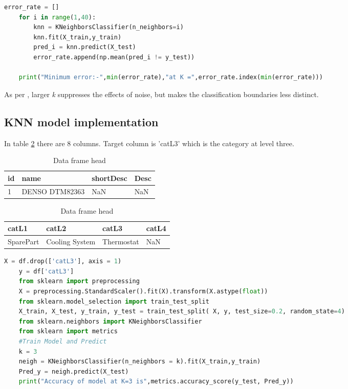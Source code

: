 \begin{lstlisting}[language=Python]
    error_rate = []
    for i in range(1,40):
        knn = KNeighborsClassifier(n_neighbors=i)
        knn.fit(X_train,y_train)
        pred_i = knn.predict(X_test)
        error_rate.append(np.mean(pred_i != y_test))

    print("Minimum error:-",min(error_rate),"at K =",error_rate.index(min(error_rate)))
\end{lstlisting}

As per \parencite{scikit-learn}, larger \textit{k} suppresses the effects of noise, but makes the classification boundaries less distinct.

\subsection{KNN model implementation}

In table \ref{table:KNN_implementation} there are 8 columns. Target column is 'catL3' which is the category at level three. 



\begin{table}[h]
    \centering
    \caption{Data frame head}
    \label{table:KNN_implementation}
    \begin{tabular}{llll}
    \toprule id & name & shortDesc & Desc \\
    \midrule

    1&DENSO DTM82363 & NaN & NaN \\
    \bottomrule
\end{tabular}

\begin{tabular}{llll}
    \toprule catL1 & catL2 & catL3 & catL4\\
    \midrule

    SparePart & Cooling System & Thermostat & NaN \\
    \bottomrule
\end{tabular}
\end{table}



\begin{lstlisting}[language=Python]
    X = df.drop(['catL3'], axis = 1)
    y = df['catL3']
    from sklearn import preprocessing
    X = preprocessing.StandardScaler().fit(X).transform(X.astype(float))
    from sklearn.model_selection import train_test_split
    X_train, X_test, y_train, y_test = train_test_split( X, y, test_size=0.2, random_state=4)
    from sklearn.neighbors import KNeighborsClassifier
    from sklearn import metrics
    #Train Model and Predict
    k = 3  
    neigh = KNeighborsClassifier(n_neighbors = k).fit(X_train,y_train)
    Pred_y = neigh.predict(X_test)
    print("Accuracy of model at K=3 is",metrics.accuracy_score(y_test, Pred_y))
\end{lstlisting}

